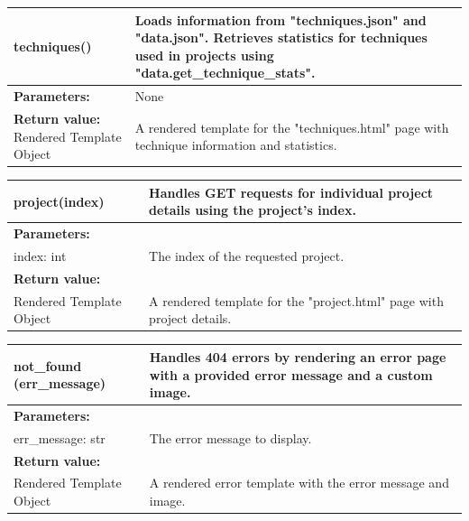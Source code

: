\documentclass{liu_mall}
\begin{document}
    \begin{table}[!h]
        \begin{tabularx}{\textwidth}{p{4.5cm}|p{11.15cm}}\hline
            \textbf{techniques()} & Loads information from "techniques.json" and "data.json".\newline
                                    Retrieves statistics for techniques used in projects\newline
                                    using "data.get\_technique\_stats".\\
            \hline
            \textbf{Parameters:} & None \\
            \hline
            \textbf{Return value:}\newline
                Rendered Template Object & A rendered template for the "techniques.html" page\newline
                                         with technique information and statistics.\\
            \hline
        \end{tabularx}
    \end{table}
    \vspace{-5mm}
    \begin{table}[!h]
        \begin{tabularx}{\textwidth}{p{4.5cm}|p{11.15cm}}
            \hline
            \textbf{project(index)} & Handles GET requests for individual project details\newline
                                      using the project's index.\\
            \hline
            \textbf{Parameters:} &\\
                index: int & The index of the requested project.\\ 
            \hline
            \textbf{Return value:} &\\
                Rendered Template Object & A rendered template for the "project.html" page with project details.\\
            \hline
        \end{tabularx}
    \end{table}
    \vspace{-5mm}
    \begin{table}[!h]
        \begin{tabularx}{\textwidth}{p{4.5cm}|p{11.15cm}}\hline
            \textbf{not\_found\newline
                (err\_message)} & Handles 404 errors by rendering an error page with a provided error message and a custom image.\\\hline
            \textbf{Parameters:} &\\
                err\_message: str & The error message to display.\\\hline
            \textbf{Return value:} &\\
                Rendered Template Object & A rendered error template with the error message and image.\\
            \hline
        \end{tabularx}
    \end{table}
\end{document}
